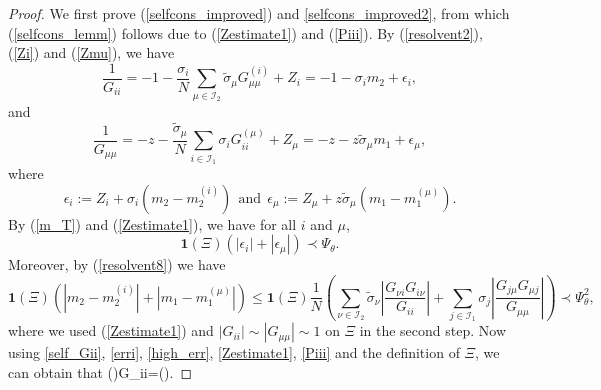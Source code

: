 \begin{proof}
We first prove (\ref{selfcons_improved}) and \eqref{selfcons_improved2}, from which (\ref{selfcons_lemm}) follows due to (\ref{Zestimate1}) and (\ref{Piii}). By (\ref{resolvent2}), (\ref{Zi}) and (\ref{Zmu}), we have
\begin{equation}\label{self_Gii}
\frac{1}{{G_{ii} }}=  - 1 - \frac{\sigma_i}{N} \sum_{\mu\in \mathcal I_2}\tilde \sigma_\mu G^{\left( i \right)}_{\mu\mu} + Z_i =  - 1 - \sigma_i m_2 + \epsilon_i,
\end{equation}
and
\begin{equation}\label{self_Gmu}
\frac{1}{{G_{\mu\mu} }}=  - z - \frac{\tilde \sigma_\mu}{N} \sum_{i\in \mathcal I_1}\sigma_i G^{\left( \mu\right)}_{ii}+ Z_{\mu} =  - z - z \tilde \sigma_\mu m_1 + \epsilon_\mu,
\end{equation}
where 
$$\epsilon_i := Z_i + \sigma_i\left(m_2 - m_2^{(i)}\right) \ \ \text{and} \ \ \epsilon_\mu := Z_{\mu} + z \tilde \sigma_\mu\left(m_1 -m_1^{(\mu)}\right).$$
By (\ref{m_T}) and (\ref{Zestimate1}), we have for all $i$ and $\mu$,
\begin{equation}\label{erri}
\mathbf 1(\Xi)\left(|\epsilon_i | + |\epsilon_\mu| \right)\prec \Psi_\theta. 
\end{equation}
Moreover, by (\ref{resolvent8}) we have
\begin{equation}\label{high_err}
\mathbf 1(\Xi)\left( |m_2 - m_2^{(i)}| + |m_1 -m_1^{(\mu)}| \right)\le \mathbf 1(\Xi)\frac{1}{N}\left(\sum_{\nu\in \mathcal I_2} \tilde \sigma_\nu \left|\frac{G_{\nu i} G_{i\nu}}{G_{ii}}\right| + \sum_{j\in \mathcal I_1}\sigma_j \left|\frac{G_{j\mu} G_{\mu j}}{G_{\mu\mu}}\right| \right)\prec \Psi_\theta^2,
\end{equation}
where we used (\ref{Zestimate1}) and $|G_{ii}| \sim |G_{\mu\mu}| \sim 1$ on $\Xi$ in the second step.
Now using \eqref{self_Gii}, \eqref{erri}, \eqref{high_err}, \eqref{Zestimate1}, \eqref{Piii} and the definition of $\Xi$, we can obtain that
\be\label{Gii0}
(\Xi)G_{ii}=(\Xi).

\end{proof}
